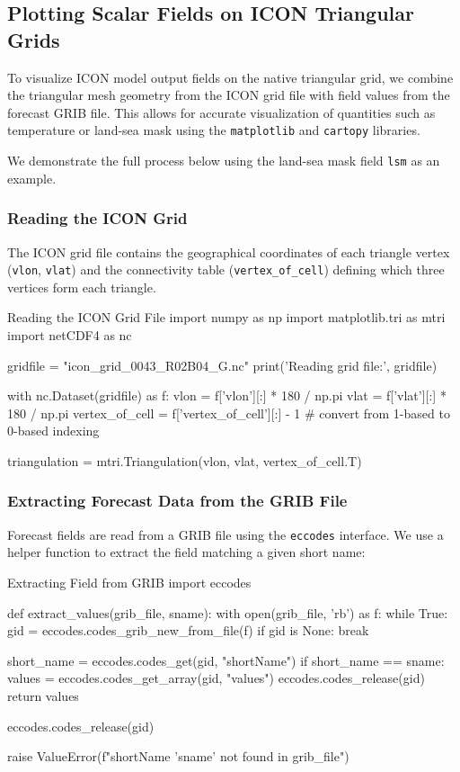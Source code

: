 \subsection{Plotting Scalar Fields on ICON Triangular Grids}

To visualize ICON model output fields on the native triangular grid, we combine the triangular mesh geometry from the ICON grid file with field values from the forecast GRIB file. This allows for accurate visualization of quantities such as temperature or land-sea mask using the \texttt{matplotlib} and \texttt{cartopy} libraries.

We demonstrate the full process below using the land-sea mask field \texttt{lsm} as an example.

\subsubsection*{Reading the ICON Grid}

The ICON grid file contains the geographical coordinates of each triangle vertex (\texttt{vlon}, \texttt{vlat}) and the connectivity table (\texttt{vertex\_of\_cell}) defining which three vertices form each triangle.

\begin{codeonly}{Reading the ICON Grid File}
import numpy as np
import matplotlib.tri as mtri
import netCDF4 as nc

gridfile = "icon_grid_0043_R02B04_G.nc"
print('Reading grid file:', gridfile)

with nc.Dataset(gridfile) as f:
    vlon = f['vlon'][:] * 180 / np.pi
    vlat = f['vlat'][:] * 180 / np.pi
    vertex_of_cell = f['vertex_of_cell'][:] - 1  # convert from 1-based to 0-based indexing

    triangulation = mtri.Triangulation(vlon, vlat, vertex_of_cell.T)
\end{codeonly}

\subsubsection*{Extracting Forecast Data from the GRIB File}

Forecast fields are read from a GRIB file using the \texttt{eccodes} interface. We use a helper function to extract the field matching a given short name:

\begin{codeonly}{Extracting Field from GRIB}
import eccodes

def extract_values(grib_file, sname):
    with open(grib_file, 'rb') as f:
        while True:
            gid = eccodes.codes_grib_new_from_file(f)
            if gid is None:
                break

            short_name = eccodes.codes_get(gid, "shortName")
            if short_name == sname:
                values = eccodes.codes_get_array(gid, "values")
                eccodes.codes_release(gid)
                return values

            eccodes.codes_release(gid)

    raise ValueError(f"shortName '{sname}' not found in {grib_file}")
\end{codeonly}

